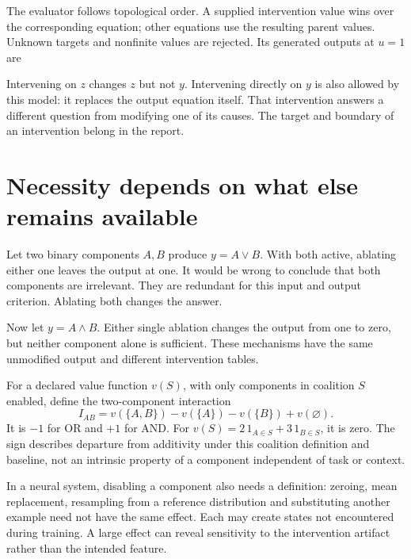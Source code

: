 The evaluator follows topological order. A supplied intervention value wins
over the corresponding equation; other equations use the resulting parent
values. Unknown targets and nonfinite values are rejected. Its generated
outputs at $u=1$ are
\begin{center}\end{center}
Intervening on $z$ changes $z$ but not $y$. Intervening directly on $y$
is also allowed by this model: it replaces the output equation itself.
That intervention answers a different question from modifying one of its
causes. The target and boundary of an intervention belong in the report.

\section{Necessity depends on what else remains available}
Let two binary components $A,B$ produce $y=A\lor B$. With both active,
ablating either one leaves the output at one. It would be wrong to conclude
that both components are irrelevant. They are redundant for this input and
output criterion. Ablating both changes the answer.

Now let $y=A\land B$. Either single ablation changes the output from one
to zero, but neither component alone is sufficient. These mechanisms have
the same unmodified output and different intervention tables.


For a declared value function $v(S)$, with only components in coalition $S$
enabled, define the two-component interaction
\begin{equation}
 I_{AB}=v(\{A,B\})-v(\{A\})-v(\{B\})+v(\varnothing).
\end{equation}
It is $-1$ for OR and $+1$ for AND. For $v(S)=2\,1_{A\in S}+3\,1_{B\in S}$,
it is zero. The sign describes departure from additivity under this
coalition definition and baseline, not an intrinsic property of a component
independent of task or context.

In a neural system, disabling a component also needs a definition: zeroing,
mean replacement, resampling from a reference distribution and substituting
another example need not have the same effect. Each may create states not
encountered during training. A large effect can reveal sensitivity to the
intervention artifact rather than the intended feature.

